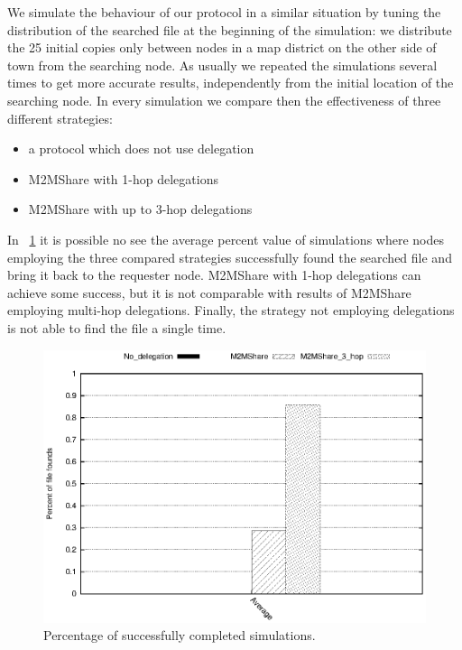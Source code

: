 We simulate the behaviour of our protocol in a similar situation by tuning the distribution of the searched file at the beginning of the simulation: we distribute the 25 initial copies only between nodes in a map district on the other side of town from the searching node. As usually we repeated the simulations several times to get more accurate results, independently from the initial location of the searching node. In every simulation we compare then the effectiveness of three different strategies:
\begin{itemize}
\item a protocol which does not use delegation
\item M2MShare with 1-hop delegations
\item M2MShare with up to 3-hop delegations
\end{itemize}

In \figurename~\ref{graficoPercCompletedMultiHop} it is possible no see the average percent value of simulations where nodes employing the three compared strategies successfully found the searched file and bring it back to the requester node. M2MShare with 1-hop delegations can achieve some success, but it is not comparable with results of M2MShare employing multi-hop delegations. Finally, the strategy not employing delegations is not able to find the file a single time.

\begin{figure}[ht]
\begin{minipage}[b]{1\linewidth}
\centering
\includegraphics[scale=0.5]{grafici/percCompletaMultiHop.eps}
\caption{Percentage of successfully completed simulations.}
\label{graficoPercCompletedMultiHop}
\end{minipage}
\end{figure}

